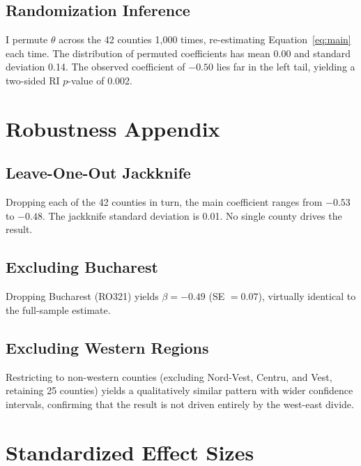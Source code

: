 \documentclass[12pt]{article}
\begin{document}
\subsection{Randomization Inference}

I permute $\theta$ across the 42 counties 1,000 times, re-estimating Equation~\eqref{eq:main} each time. The distribution of permuted coefficients has mean 0.00 and standard deviation 0.14. The observed coefficient of $-0.50$ lies far in the left tail, yielding a two-sided RI $p$-value of 0.002.


\section{Robustness Appendix}
\label{app:robustness}

\subsection{Leave-One-Out Jackknife}

Dropping each of the 42 counties in turn, the main coefficient ranges from $-0.53$ to $-0.48$. The jackknife standard deviation is 0.01. No single county drives the result.

\subsection{Excluding Bucharest}

Dropping Bucharest (RO321) yields $\beta = -0.49$ (SE $= 0.07$), virtually identical to the full-sample estimate.

\subsection{Excluding Western Regions}

Restricting to non-western counties (excluding Nord-Vest, Centru, and Vest, retaining 25 counties) yields a qualitatively similar pattern with wider confidence intervals, confirming that the result is not driven entirely by the west-east divide.


\section{Standardized Effect Sizes}
\label{sec:sde}


\end{document}
